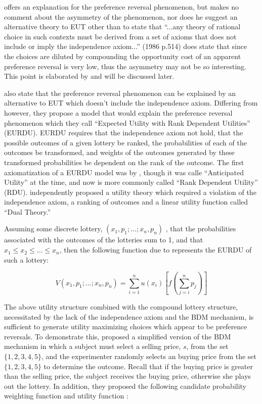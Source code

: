 \documentclass[../main.tex]{subfiles}
\begin{document}
\textcite{Holt1986} offers an explanation for the preference reversal phenomenon, but makes no comment about the asymmetry of the phenomenon, nor does he suggest an alternative theory to EUT other than to state that \enquote{...any theory of rational choice in such contexts must be derived from a set of axioms that does not include or imply the independence axiom...} (1986 p.514) \textcite{Holt1986} does state that since the choices are diluted by compounding the opportunity cost of an apparent preference reversal is very low, thus the asymmetry may not be so interesting.
This point is elaborated by \textcite{Harrison1989, Harrison1992} and will be discussed later.

\textcite{Karni1987} also state that the preference reversal phenomenon can be explained by an alternative to EUT which doesn't include the independence axiom.
Differing from \textcite{Holt1986} however, they propose a model that would explain the preference reversal phenomenon which they call \enquote{Expected Utility with Rank Dependent Utilities} (EURDU).
EURDU requires that  the independence axiom not hold, that the possible outcomes of a given lottery be ranked, the probabilities of each of the outcomes be transformed, and weights of the outcomes generated by these transformed probabilities be dependent on the rank of the outcome.
The first axiomatization of a EURDU model was by \textcite{Quiggin1982}, though it was calle \enquote{Anticipated Utility} at the time, and now is more commonly called \enquote{Rank Dependent Utility} (RDU).
\textcite{Yaari1987} independently proposed a utility theory which required a violation of the independence axiom, a ranking of outcomes and a linear utility function called \enquote{Dual Theory.}

Assuming some discrete lottery, $(x_1,p_1;\ldots;x_n,p_n)$ , that the probabilities associated with the outcomes of the lotteries sum to 1, and that $x_1 \leq x_2 \leq \ldots \leq x_n$, then the following function due to \textcite{Karni1987} represents the EURDU of such a lottery:

\begin{equation}
	\label{eq:KS1987-EURDU}
	V(x_1,p_1; \ldots ; x_n, p_n) = \sum_{i=1}^{n}u(x_i) \left[ f\left( \sum_{j=i}^n p_j\right)  \right]
\end{equation}

The above utility structure combined with the compound lottery structure, necessitated by the lack of the independence axiom and the BDM mechanism, is sufficient to generate utility maximizing choices which appear to be preference reversals. To demonstrate this, \textcite{Karni1987} proposed a simplified version of the BDM mechanism in which a subject must select a selling price, $s$, from the set $\lbrace 1,2,3,4,5\rbrace$, and the experimenter randomly selects an buying price from the set $\lbrace 1,2,3,4,5 \rbrace$ to determine the outcome.
Recall that if the buying price is greater than the selling price, the subject receives the buying price, otherwise she plays out the lottery.
In addition, they proposed the following candidate probability weighting function and utility function :
\end{document}
